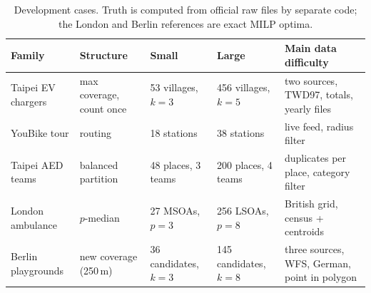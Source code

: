 \begin{table}[t]\centering\small
\caption{Development cases. Truth is computed from official raw files by separate code; the London and Berlin
references are exact MILP optima.}
\label{tab:devcases}
\begin{tabular}{@{}p{2.6cm}p{3.05cm}p{2.4cm}p{2.45cm}p{3.85cm}@{}}\toprule
Family & Structure & Small & Large & Main data difficulty \\\midrule
Taipei EV chargers & max coverage, count once & 53 villages, $k=3$ & 456 villages, $k=5$ & two sources, TWD97, totals, yearly files \\
YouBike tour & routing & 18 stations & 38 stations & live feed, radius filter \\
Taipei AED teams & balanced partition & 48 places, 3 teams & 200 places, 4 teams & duplicates per place, category filter \\
London ambulance & $p$-median & 27 MSOAs, $p=3$ & 256 LSOAs, $p=8$ & British grid, census + centroids \\
Berlin playgrounds & new coverage (250\,m) & 36 candidates, $k=3$ & 145 candidates, $k=8$ & three sources, WFS, German, point in polygon \\
\bottomrule\end{tabular}\end{table}

